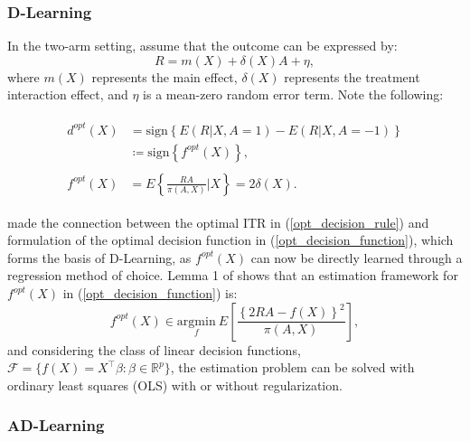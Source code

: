 \documentclass[useAMS,usenatbib]{biom}
\begin{document}
\subsubsection{D-Learning} \label{subsubsec_dlearn}

In the two-arm setting, assume that the outcome can be expressed by:
\begin{equation} \label{binary_working_model}
    R = m(X) + \delta(X)A + \eta,
\end{equation}
where $m(X)$ represents the main effect, $\delta(X)$ represents the treatment interaction effect, and $\eta$ is a mean-zero random error term. Note the following:

\begin{align}
\begin{split}
d^{opt}(X) &= \mbox{sign} \left\{ E(R | X, A=1) - E(R | X, A=-1) \right\} \\ &\coloneqq \mbox{sign} \left\{ f^{opt}(X) \right\}, 
\end{split} \label{opt_decision_rule} \\
\begin{split}
    f^{opt}(X) &= E \left\{ \frac{RA}{\pi(A,X)} \bigg| X \right\} = 2\delta(X). \label{opt_decision_function}
\end{split}
\end{align}

\cite{tian_simple_2014} made the connection between the optimal ITR in (\ref{opt_decision_rule}) and formulation of the optimal decision function in (\ref{opt_decision_function}), which forms the basis of D-Learning, as $f^{opt}(X)$ can now be directly learned through a regression method of choice. Lemma 1 of \cite{qi_d-learning_2018} shows that an estimation framework for $f^{opt}(X)$ in (\ref{opt_decision_function}) is:
\begin{equation} \label{dlearning}
 f^{opt}(X) \in \underset{f}{\mathrm{argmin}}\ E \left[ \frac{\left\{ 2RA - f(X) \right\}^2}{\pi(A,X)} \right],   
\end{equation}
and considering the class of linear decision functions, $\mathcal{F} = \{ f(X) = X^{\top}\beta : \beta \in \mathbb{R}^{p} \}$, the estimation problem can be solved with ordinary least squares (OLS) with or without regularization.

\subsubsection{AD-Learning} \label{subsubsec_adlearn}
\end{document}
